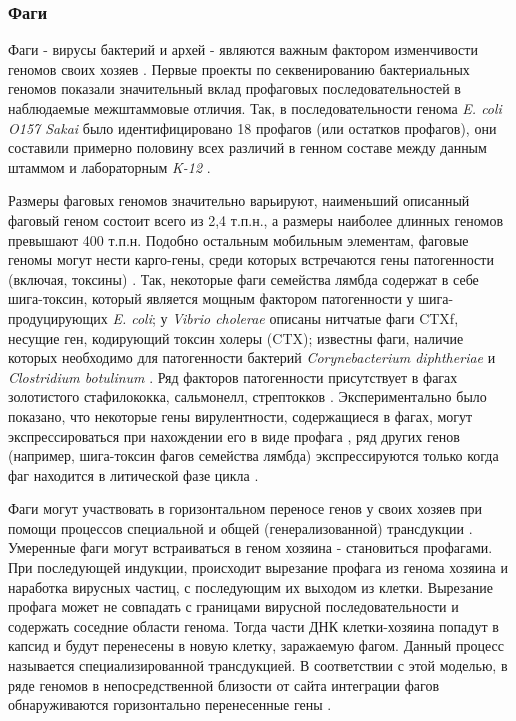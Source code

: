 \subsubsection{Фаги}
Фаги - вирусы бактерий и архей - являются важным фактором изменчивости геномов своих хозяев \cite{ventura2002transcription}. Первые проекты по секвенированию бактериальных геномов показали значительный вклад профаговых последовательностей в наблюдаемые межштаммовые отличия. Так, в последовательности генома \textit{E. coli O157 Sakai} было идентифицировано 18 профагов (или остатков профагов), они составили примерно половину всех различий в генном составе между данным штаммом и лабораторным \textit{K-12} \cite{hayashi2001complete}. 


Размеры фаговых геномов значительно варьируют, наименьший описанный фаговый геном состоит всего из 2,4 т.п.н., а размеры наиболее длинных геномов превышают 400 т.п.н. Подобно остальным мобильным элементам, фаговые геномы могут нести карго-гены, среди которых встречаются гены патогенности (включая, токсины) \cite{schroven2021bacteriophages}. Так, некоторые фаги семейства лямбда содержат в себе шига-токсин, который является мощным фактором патогенности у шига-продуцирующих \textit {E. coli}; у \textit{Vibrio cholerae} описаны нитчатые фаги CTXf, несущие ген, кодирующий токсин холеры (CTX); известны фаги, наличие которых необходимо для патогенности бактерий \textit{Corynebacterium diphtheriae} и \textit{Clostridium botulinum} \cite{brussow2004phages}. Ряд факторов патогенности присутствует в фагах золотистого стафилококка, сальмонелл, стрептокков \cite{brussow2004phages}. Экспериментально было показано, что некоторые гены вирулентности, содержащиеся в фагах, могут экспрессироваться при нахождении его в виде профага \cite{ventura2002transcription}, ряд других генов (например, шига-токсин фагов семейства лямбда) экспрессируются только когда фаг находится в литической фазе цикла \cite{berger2019carriage}.

Фаги могут участвовать в горизонтальном переносе генов у своих хозяев при помощи процессов специальной и общей (генерализованной) трансдукции \cite{canchaya2003phage, touchon2017embracing}. Умеренные фаги могут встраиваться в геном хозяина - становиться профагами. При последующей индукции, происходит вырезание профага из генома хозяина и наработка вирусных частиц, с последующим их выходом из клетки. Вырезание профага может не совпадать с границами вирусной последовательности и содержать соседние области генома. Тогда части ДНК клетки-хозяина попадут в капсид и будут перенесены в новую клетку, заражаемую фагом. Данный процесс называется специализированной трансдукцией. В соответствии с этой моделью, в ряде геномов в непосредственной близости от сайта интеграции фагов обнаруживаются горизонтально перенесенные гены \cite{canchaya2003phage}. 

